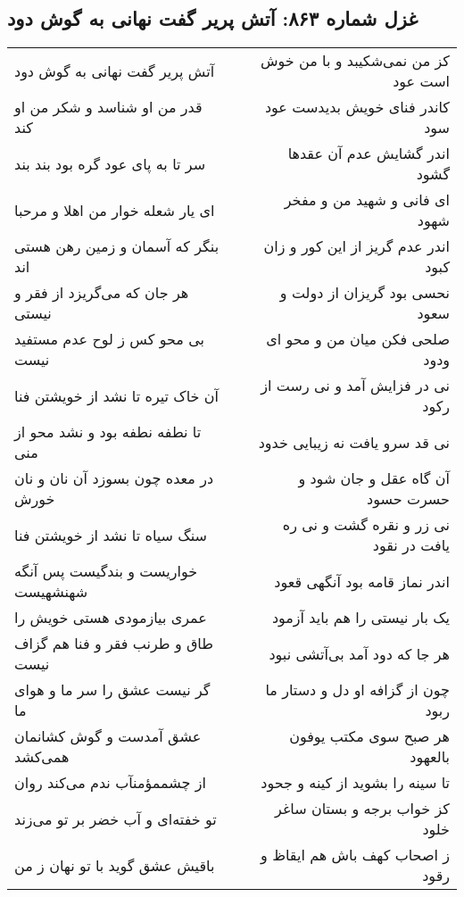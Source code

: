 \begin{center}
\section*{غزل شماره ۸۶۳: آتش پریر گفت نهانی به گوش دود}
\label{sec:0863}
\begin{longtable}{l p{0.5cm} r}
آتش پریر گفت نهانی به گوش دود
&&
کز من نمی‌شکیبد و با من خوش است عود
\\
قدر من او شناسد و شکر من او کند
&&
کاندر فنای خویش بدیدست عود سود
\\
سر تا به پای عود گره بود بند بند
&&
اندر گشایش عدم آن عقدها گشود
\\
ای یار شعله خوار من اهلا و مرحبا
&&
ای فانی و شهید من و مفخر شهود
\\
بنگر که آسمان و زمین رهن هستی اند
&&
اندر عدم گریز از این کور و زان کبود
\\
هر جان که می‌گریزد از فقر و نیستی
&&
نحسی بود گریزان از دولت و سعود
\\
بی محو کس ز لوح عدم مستفید نیست
&&
صلحی فکن میان من و محو ای ودود
\\
آن خاک تیره تا نشد از خویشتن فنا
&&
نی در فزایش آمد و نی رست از رکود
\\
تا نطفه نطفه بود و نشد محو از منی
&&
نی قد سرو یافت نه زیبایی خدود
\\
در معده چون بسوزد آن نان و نان خورش
&&
آن گاه عقل و جان شود و حسرت حسود
\\
سنگ سیاه تا نشد از خویشتن فنا
&&
نی زر و نقره گشت و نی ره یافت در نقود
\\
خواریست و بندگیست پس آنگه شهنشهیست
&&
اندر نماز قامه بود آنگهی قعود
\\
عمری بیازمودی هستی خویش را
&&
یک بار نیستی را هم باید آزمود
\\
طاق و طرنب فقر و فنا هم گزاف نیست
&&
هر جا که دود آمد بی‌آتشی نبود
\\
گر نیست عشق را سر ما و هوای ما
&&
چون از گزافه او دل و دستار ما ربود
\\
عشق آمدست و گوش کشانمان همی‌کشد
&&
هر صبح سوی مکتب یوفون بالعهود
\\
از چشممؤمنآب ندم می‌کند روان
&&
تا سینه را بشوید از کینه و جحود
\\
تو خفته‌ای و آب خضر بر تو می‌زند
&&
کز خواب برجه و بستان ساغر خلود
\\
باقیش عشق گوید با تو نهان ز من
&&
ز اصحاب کهف باش هم ایقاظ و رقود
\\
\end{longtable}
\end{center}

